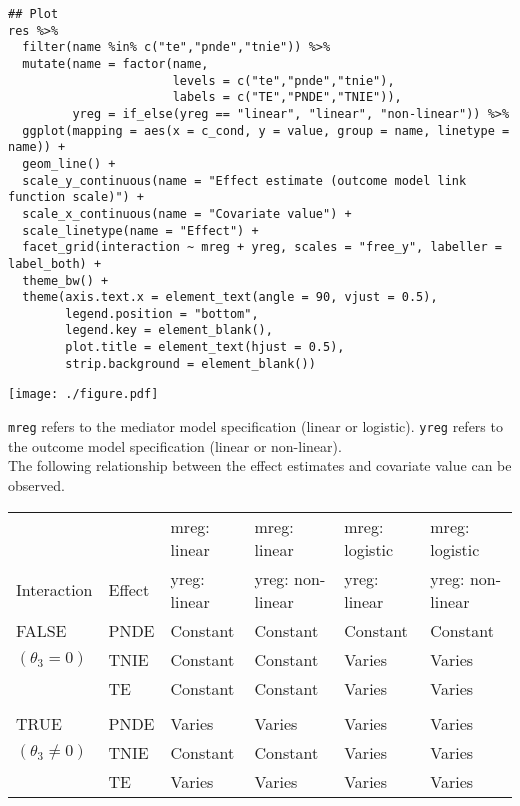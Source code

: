\documentclass[10pt]{article}
\begin{document}
\begin{verbatim}
## Plot
res %>%
  filter(name %in% c("te","pnde","tnie")) %>%
  mutate(name = factor(name,
                       levels = c("te","pnde","tnie"),
                       labels = c("TE","PNDE","TNIE")),
         yreg = if_else(yreg == "linear", "linear", "non-linear")) %>%
  ggplot(mapping = aes(x = c_cond, y = value, group = name, linetype = name)) +
  geom_line() +
  scale_y_continuous(name = "Effect estimate (outcome model link function scale)") +
  scale_x_continuous(name = "Covariate value") +
  scale_linetype(name = "Effect") +
  facet_grid(interaction ~ mreg + yreg, scales = "free_y", labeller = label_both) +
  theme_bw() +
  theme(axis.text.x = element_text(angle = 90, vjust = 0.5),
        legend.position = "bottom",
        legend.key = element_blank(),
        plot.title = element_text(hjust = 0.5),
        strip.background = element_blank())
\end{verbatim}

\begin{center}
\texttt{[image: ./figure.pdf]}
\end{center}

\normalsize

\texttt{mreg} refers to the mediator model specification (linear or logistic). \texttt{yreg} refers to the outcome model specification (linear or non-linear).\\

The following relationship between the effect estimates and covariate value can be observed.

\begin{center}
\begin{tabular}{llllll}
 &  & mreg: linear & mreg: linear & mreg: logistic & mreg: logistic\\
Interaction & Effect & yreg: linear & yreg: non-linear & yreg: linear & yreg: non-linear\\
\hline
FALSE & PNDE & Constant & Constant & Constant & Constant\\
\((\theta_{3} = 0)\) & TNIE & Constant & Constant & Varies & Varies\\
 & TE & Constant & Constant & Varies & Varies\\
 &  &  &  &  & \\
TRUE & PNDE & Varies & Varies & Varies & Varies\\
\((\theta_{3} \ne 0)\) & TNIE & Constant & Constant & Varies & Varies\\
 & TE & Varies & Varies & Varies & Varies\\
\end{tabular}
\end{center}
\end{document}
